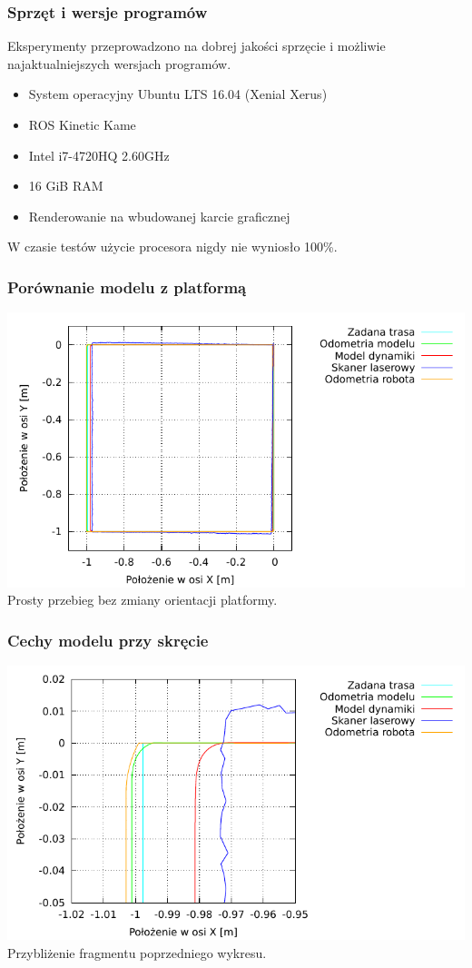 \documentclass{beamer}
\begin{document}
	\begin{frame}
		\frametitle{Sprzęt i wersje programów}
		Eksperymenty przeprowadzono na dobrej jakości sprzęcie i możliwie najaktualniejszych wersjach programów.
		\begin{itemize}
			\item System operacyjny Ubuntu LTS 16.04 (Xenial Xerus)
			\item ROS Kinetic Kame
		\end{itemize}
		\begin{itemize}
			\item Intel i7-4720HQ 2.60GHz
			\item 16 GiB RAM
			\item Renderowanie na wbudowanej karcie graficznej
		\end{itemize}
		W czasie testów użycie procesora nigdy nie wyniosło 100\%.
	\end{frame}
	
	\begin{frame}
		\frametitle{Porównanie modelu z platformą}
		\centering
		\includegraphics[width=\textwidth]{graphics/velmobil_xy.pdf} \\
		Prosty przebieg bez zmiany orientacji platformy.
	\end{frame}
	
	\begin{frame}
		\frametitle{Cechy modelu przy skręcie}
		\centering
		\includegraphics[width=\textwidth]{graphics/velmobil_xy_s.pdf} \\
		Przybliżenie fragmentu poprzedniego wykresu.
	\end{frame}
	
\end{document}
